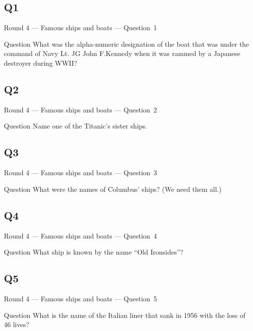 \documentclass[11pt]{beamer}
\begin{document}
\subsection*{Q1}
\begin{frame}[t]{Round 4 --- Famous ships and boats --- \mbox{Question 1}}
\vspace{-0.5em}
\begin{block}{Question}
What was the alpha-numeric designation of the boat that was under the command of Navy Lt. JG John F.\@  Kennedy when it was rammed by a Japanese destroyer during WWII\@?
\end{block}
\end{frame}
\subsection*{Q2}
\begin{frame}[t]{Round 4 --- Famous ships and boats --- \mbox{Question 2}}
\vspace{-0.5em}
\begin{block}{Question}
Name one of the Titanic's sister ships.
\end{block}
\end{frame}
\subsection*{Q3}
\begin{frame}[t]{Round 4 --- Famous ships and boats --- \mbox{Question 3}}
\vspace{-0.5em}
\begin{block}{Question}
What were the names of Columbus' ships? (We need them all.)
\end{block}
\end{frame}
\subsection*{Q4}
\begin{frame}[t]{Round 4 --- Famous ships and boats --- \mbox{Question 4}}
\vspace{-0.5em}
\begin{block}{Question}
What ship is known by the name ``Old Ironsides''?
\end{block}
\end{frame}
\subsection*{Q5}
\begin{frame}[t]{Round 4 --- Famous ships and boats --- \mbox{Question 5}}
\vspace{-0.5em}
\begin{block}{Question}
What is the name of the Italian liner that sank in 1956 with the loss of 46 lives?
\end{block}
\end{frame}
\end{document}
